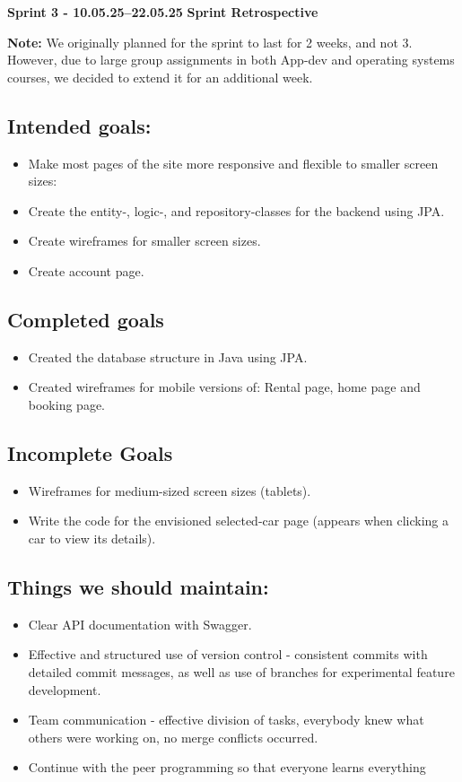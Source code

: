 \textbf{Sprint 3 - 10.05.25–22.05.25} 
\textbf{Sprint Retrospective} 

\textbf{Note:}
We originally planned for the sprint to last for 2 weeks, and not 3. However, due to large group assignments in both App-dev and operating systems courses, we decided to extend it for an additional week.

\subsection{Intended goals:}
\begin{itemize}
    \item Make most pages of the site more responsive and flexible to smaller screen sizes:
    \item Create the entity-, logic-, and repository-classes for the backend using JPA.
    \item Create wireframes for smaller screen sizes.
    \item Create account page.
\end{itemize}

\subsection{Completed goals}
\begin{itemize}
    \item Created the database structure in Java using JPA.
    \item Created wireframes for mobile versions of: Rental page, home page and booking page.
\end{itemize}

\subsection{Incomplete Goals}
\begin{itemize}
    \item Wireframes for medium-sized screen sizes (tablets).
    \item Write the code for the envisioned selected-car page (appears when clicking a car to view its details).
\end{itemize}
   
\subsection{Things we should maintain:}
\begin{itemize}
    \item Clear API documentation with Swagger.
    \item Effective and structured use of version control - consistent commits with detailed commit messages, as well as use of branches for experimental feature development.
    \item Team communication - effective division of tasks, everybody knew what others were working on, no merge conflicts occurred.
    \item Continue with the peer programming so that everyone learns everything
\end{itemize}

